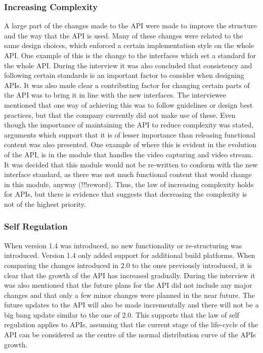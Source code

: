 \documentclass{sig-alternate}
\begin{document}
\subsubsection{Increasing Complexity} \label{sec:law2}
A large part of the changes made to the API were made to improve the structure and the way that the API is used. Many of these changes were related to the same design choices, which enforced a certain implementation style on the whole API. One example of this is the change to the interfaces which set a standard for the whole API. During the interview it was also concluded that consistency and following certain standards is an important factor to consider when designing APIs. It was also made clear a contributing factor for changing certain parts of the API was to bring it in line with the new interfaces. The interviewee mentioned that one way of achieving this was to follow guidelines or design best practices, but that the company currently did not make use of these. Even though the importance of maintaining the API to reduce complexity was stated, arguments which support that it is of lesser importance than releasing functional content was also presented. One example of where this is evident in the evolution of the API, is in the module that handles the video capturing and video stream. It was decided that this module would not be re-written to conform with the new interface standard, as there was not much functional content that would change in this module, anyway (!!!reword). Thus, the law of increasing complexity holds for APIs, but there is evidence that suggests that decreasing the complexity is not of the highest priority. 

\subsubsection{Self Regulation} \label{sec:law3}
When version 1.4 was introduced, no new functionality or re-structuring was introduced. Version 1.4 only added support for additional build platforms. When comparing the changes introduced in 2.0 to the ones previously introduced, it is clear that the growth of the API has increased gradually. During the interview it was also mentioned that the future plans for the API did not include any major changes and that only a few minor changes were planned in the near future. The future updates to the API will also be made incrementally and there will not be a big bang update similar to the one of 2.0. This supports that the law of self regulation applies to APIs, assuming that the current stage of the life-cycle of the API can be considered as the centre of the normal distribution curve of the APIs growth. 
\end{document}
